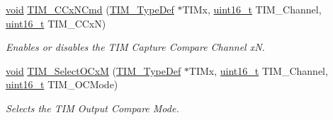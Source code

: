 \begin{DoxyCompactItemize}
\hyperlink{group___n_a_m_e_ga18028b8badbf1ea7e704ccac3c488e82}{void} \hyperlink{group___t_i_m___group2_ga304ff7c8a1615498da749bf2507e9f2b}{T\-I\-M\-\_\-\-C\-Cx\-N\-Cmd} (\hyperlink{struct_t_i_m___type_def}{T\-I\-M\-\_\-\-Type\-Def} $\ast$T\-I\-Mx, \hyperlink{stdint_8h_a273cf69d639a59973b6019625df33e30}{uint16\-\_\-t} T\-I\-M\-\_\-\-Channel, \hyperlink{stdint_8h_a273cf69d639a59973b6019625df33e30}{uint16\-\_\-t} T\-I\-M\-\_\-\-C\-Cx\-N)
\begin{DoxyCompactList}\small\item\em Enables or disables the T\-I\-M Capture Compare Channel x\-N. \end{DoxyCompactList}\item 
\hyperlink{group___n_a_m_e_ga18028b8badbf1ea7e704ccac3c488e82}{void} \hyperlink{group___t_i_m___group2_ga83ea0af5a7c1af521236ce5e4d2c42b0}{T\-I\-M\-\_\-\-Select\-O\-Cx\-M} (\hyperlink{struct_t_i_m___type_def}{T\-I\-M\-\_\-\-Type\-Def} $\ast$T\-I\-Mx, \hyperlink{stdint_8h_a273cf69d639a59973b6019625df33e30}{uint16\-\_\-t} T\-I\-M\-\_\-\-Channel, \hyperlink{stdint_8h_a273cf69d639a59973b6019625df33e30}{uint16\-\_\-t} T\-I\-M\-\_\-\-O\-C\-Mode)
\begin{DoxyCompactList}\small\item\em Selects the T\-I\-M Output Compare Mode. \end{DoxyCompactList}\end{DoxyCompactItemize}


